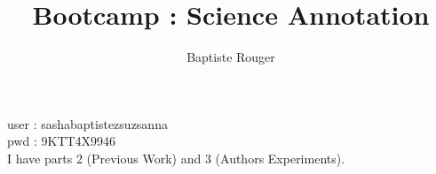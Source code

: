 \documentclass{article}
\title{Bootcamp : Science Annotation}
\author{Baptiste Rouger}
\begin{document}
    \maketitle

    \tableofcontents

    \newpage

    user : sashabaptistezsuzsanna\\
    pwd : 9KTT4X9946\\

    I have parts 2 (Previous Work) and 3 (Authors Experiments).
\end{document}
